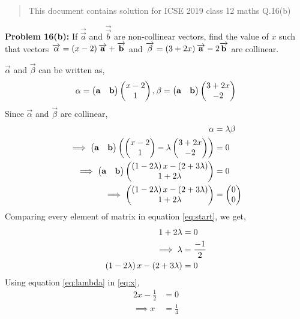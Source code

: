 \documentclass[journal,12pt,twocolumn]{IEEEtran}
\begin{document}
\maketitle

\newpage


\bigskip

\begin{abstract}
This document contains solution for ICSE 2019 class 12 maths Q.16(b)  
\end{abstract}
\begin{flushleft}
\textbf{Problem 16(b): } If $\overrightarrow{\vec{a}}$ and $\overrightarrow{\vec{b}}$ are non-collinear vectors, find the value of $x$ such that vectors $\overrightarrow{\mathbf{\alpha}} = \left(x-2\right)\overrightarrow{\mathbf{a}} + \overrightarrow{\mathbf{b}}$ and $\overrightarrow{\mathbf{\beta}} = \left(3 + 2x\right)\overrightarrow{\mathbf{a}} - 2\overrightarrow{\mathbf{b}}$ are collinear.

	\solution
$\vec{\alpha}$ and $\vec{\beta}$ can be written as,
\begin{align}
\mathbf{\alpha} = \begin{pmatrix} \mathbf{a} & \mathbf{b}\end{pmatrix} \begin{pmatrix}x-2 \\ 1\end{pmatrix} , \mathbf{\beta} = \begin{pmatrix} \mathbf{a} & \mathbf{b}\end{pmatrix} \begin{pmatrix}3+2x \\ -2\end{pmatrix}
\end{align}
Since $\vec{\alpha}$ and $\vec{\beta}$ are collinear,
\begin{align}
\mathbf{\alpha} &= \lambda \mathbf{\beta} \\
\implies \begin{pmatrix} \mathbf{a} & \mathbf{b}\end{pmatrix} \left(\begin{pmatrix}x-2 \\ 1\end{pmatrix} -\lambda \begin{pmatrix}3+2x \\ -2\end{pmatrix}\right) &= 0 \\
\implies \begin{pmatrix} \mathbf{a} & \mathbf{b}\end{pmatrix} \begin{pmatrix}\left(1-2\lambda\right)x - \left(2+3\lambda\right) \\ 1+2\lambda\end{pmatrix} &= 0 \\
\label{eq:start}
\implies \begin{pmatrix}\left(1-2\lambda\right)x - \left(2+3\lambda\right) \\ 1+2\lambda\end{pmatrix} &= \begin{pmatrix}0 \\ 0\end{pmatrix}
\end{align}
Comparing every element of matrix in equation \eqref{eq:start}, we get,
\begin{align}
1 + 2\lambda &= 0 \\
\label{eq:lambda}
\implies \lambda &= \frac{-1}{2} \\
\label{eq:x}
\left(1-2\lambda\right)x - \left(2+3\lambda\right) &= 0
\end{align}
Using equation \eqref{eq:lambda} in  \eqref{eq:x},
\begin{align}
2x - \frac{1}{2} &= 0 \\
\implies x &= \frac{1}{4}
\end{align}
\end{flushleft}
\end{document}
